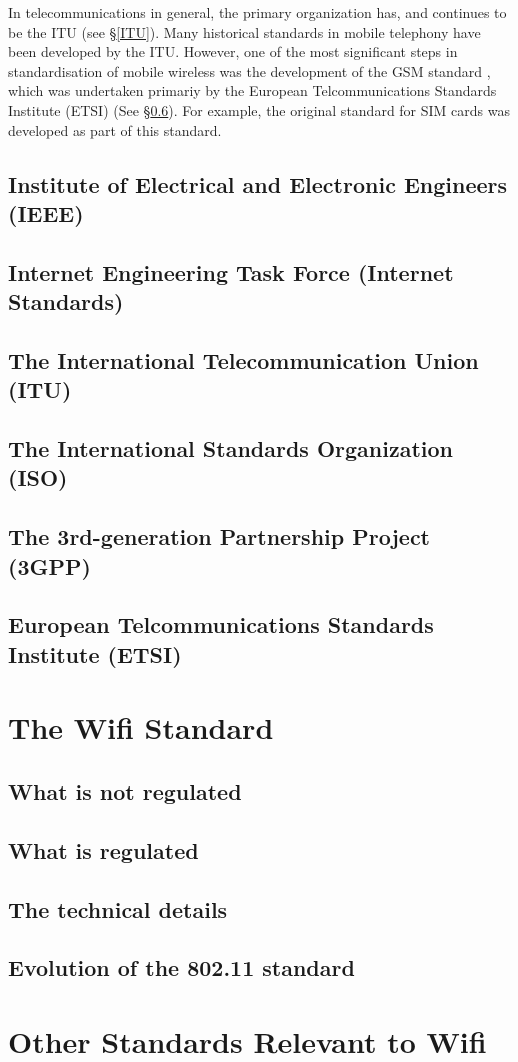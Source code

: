 In telecommunications in general, the primary organization has, and continues
to be the ITU (see \S\ref{ITU}). Many historical standards in mobile
telephony have been developed by the ITU. However, one of the most significant
steps in standardisation of mobile wireless was the
development of the GSM standard \cite{GSM}, which was undertaken primariy by the
European Telcommunications Standards Institute (ETSI) (See \S\ref{ETSI}).
For example, the original standard for SIM cards was developed as part of
this standard.




\subsection{Institute of Electrical and Electronic Engineers (IEEE)}

\subsection{Internet Engineering Task Force (Internet Standards)}

\subsection{The International Telecommunication Union (ITU)}\label{ITU}

\subsection{The International Standards Organization (ISO)}

\subsection{The 3rd-generation Partnership Project (3GPP)}

\subsection{European Telcommunications Standards Institute (ETSI)}\label{ETSI}

\section{The Wifi Standard}

\subsection{What is not regulated}

\subsection{What is regulated}

\subsection{The technical details}

\subsection{Evolution of the 802.11 standard}

\section{Other Standards Relevant to Wifi}
